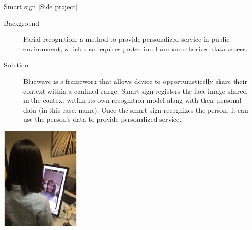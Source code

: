 \documentclass[a0paper,portrait]{baposter}
\begin{document}
\begin{poster}
\begin{posterbox}[name=side,column=2,span=3,below=interface]{Smart sign [Side project]}
\begin{minipage}[l]{0.40\linewidth}
  \begin{description}
    \item[Background]
      Facial recognition: a method to provide personalized service in public environment, which also requires protection from unauthorized data access.
    \item[Solution]
      Bluewave is a framework that allows device to opportunistically share their context within a confined range. Smart sign registers the face image shared in the context within its own recognition model along with their personal data (in this case, name). Once the smart sign recognizes the person, it can use the person's data to provide personalized service.
  \end{description}
\end{minipage}
\hspace{0.5cm}
\begin{minipage}[r]{0.45\linewidth}
  \begin{center}
    
    \label{fig:face_json}
  \end{center}
  \begin{center}
    \includegraphics[width=40mm]{face}
    \label{fig:face}
  \end{center}
\end{minipage}
\end{posterbox}






\end{poster}
\end{document}
